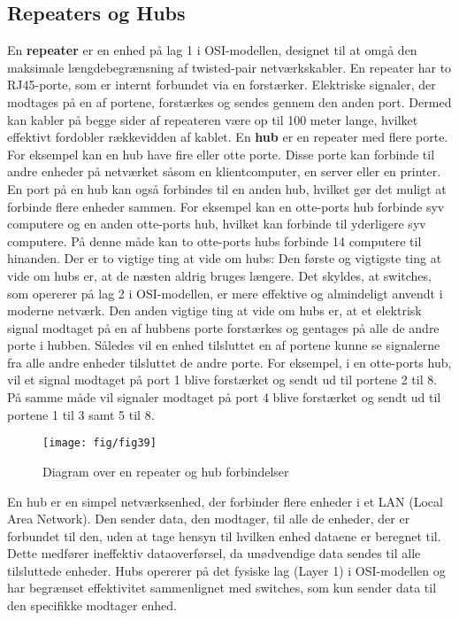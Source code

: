 \subsection{Repeaters og Hubs}
En \textbf{repeater} er en enhed på lag 1 i OSI-modellen, designet til at omgå den maksimale længdebegrænsning af twisted-pair netværkskabler. En repeater har to RJ45-porte, som er internt forbundet via en forstærker. Elektriske signaler, der modtages på en af portene, forstærkes og sendes gennem den anden port. Dermed kan kabler på begge sider af repeateren være op til 100 meter lange, hvilket effektivt fordobler rækkevidden af kablet.
\newline
\newline
\noindent En \textbf{hub} er en repeater med flere porte. For eksempel kan en hub have fire eller otte porte. Disse porte kan forbinde til andre enheder på netværket såsom en klientcomputer, en server eller en printer. En port på en hub kan også forbindes til en anden hub, hvilket gør det muligt at forbinde flere enheder sammen. For eksempel kan en otte-ports hub forbinde syv computere og en anden otte-ports hub, hvilket kan forbinde til yderligere syv computere. På denne måde kan to otte-ports hubs forbinde 14 computere til hinanden.
\newline
\newline
\noindent Der er to vigtige ting at vide om hubs:
\newline
\newline
\noindent Den første og vigtigste ting at vide om hubs er, at de næsten aldrig bruges længere. Det skyldes, at switches, som opererer på lag 2 i OSI-modellen, er mere effektive og almindeligt anvendt i moderne netværk.
\newline
\newline
\noindent Den anden vigtige ting at vide om hubs er, at et elektrisk signal modtaget på en af hubbens porte forstærkes og gentages på alle de andre porte i hubben. Således vil en enhed tilsluttet en af portene kunne se signalerne fra alle andre enheder tilsluttet de andre porte. For eksempel, i en otte-ports hub, vil et signal modtaget på port 1 blive forstærket og sendt ud til portene 2 til 8. På samme måde vil signaler modtaget på port 4 blive forstærket og sendt ud til portene 1 til 3 samt 5 til 8.

\begin{figure}[h!]
	\centering
	\texttt{[image: fig/fig39]}
	\caption{Diagram over en repeater og hub forbindelser}
	\label{fig:repeater_hub}
\end{figure}
\noindent En hub er en simpel netværksenhed, der forbinder flere enheder i et LAN (Local Area Network). Den sender data, den modtager, til alle de enheder, der er forbundet til den, uden at tage hensyn til hvilken enhed dataene er beregnet til. Dette medfører ineffektiv dataoverførsel, da unødvendige data sendes til alle tilsluttede enheder. Hubs opererer på det fysiske lag (Layer 1) i OSI-modellen og har begrænset effektivitet sammenlignet med switches, som kun sender data til den specifikke modtager enhed.

